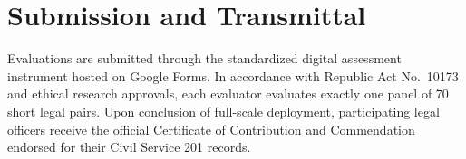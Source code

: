 \section{Submission and Transmittal}
\label{sec:app_guide_submission}

Evaluations are submitted through the standardized digital assessment instrument hosted on Google Forms. In accordance with Republic Act No.~10173 and ethical research approvals, each evaluator evaluates exactly one panel of 70 short legal pairs. Upon conclusion of full-scale deployment, participating legal officers receive the official Certificate of Contribution and Commendation endorsed for their Civil Service 201 records.
